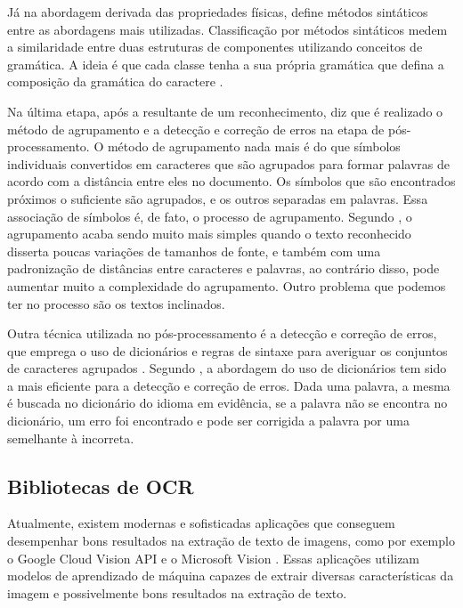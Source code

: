 Já na abordagem derivada das propriedades físicas,  define métodos sintáticos entre as abordagens mais utilizadas. Classificação por métodos sintáticos medem a similaridade entre duas estruturas de componentes utilizando conceitos de gramática. A ideia é que cada classe tenha a sua própria gramática que defina a composição da gramática do caractere \cite{ANDRADE2016}. 




Na última etapa, após a resultante de um reconhecimento,  diz que é realizado o método de agrupamento e a detecção e correção de erros na etapa de pós-processamento. O método de agrupamento nada mais é do que símbolos individuais convertidos em caracteres que são agrupados para formar palavras de acordo com a distância entre eles no documento. Os símbolos que são encontrados próximos o suficiente são agrupados, e os outros separadas em palavras. Essa associação de símbolos é, de fato, o processo de agrupamento. Segundo , o agrupamento acaba sendo muito mais simples quando o texto reconhecido disserta poucas variações de tamanhos de fonte, e também com uma padronização de distâncias entre caracteres e palavras, ao contrário disso, pode aumentar muito a complexidade do agrupamento. Outro problema que podemos ter no processo são os textos inclinados.


Outra técnica utilizada no pós-processamento é a detecção e correção de erros, que emprega o uso de dicionários e regras de sintaxe para averiguar os conjuntos de caracteres agrupados \cite{Eikvil1993}. Segundo , a abordagem do uso de dicionários tem sido a mais eficiente para a detecção e correção de erros. Dada uma palavra, a mesma é buscada no dicionário do idioma em evidência, se a palavra não se encontra no dicionário, um erro foi encontrado e pode ser corrigida a palavra por uma semelhante à incorreta.



\subsection{Bibliotecas de OCR}

Atualmente, existem modernas e sofisticadas aplicações que conseguem desempenhar bons resultados na extração de texto de imagens, como por exemplo o Google Cloud Vision API e o Microsoft Vision . Essas aplicações utilizam modelos de aprendizado de máquina capazes de extrair diversas características da imagem e possivelmente bons resultados na extração de texto.

